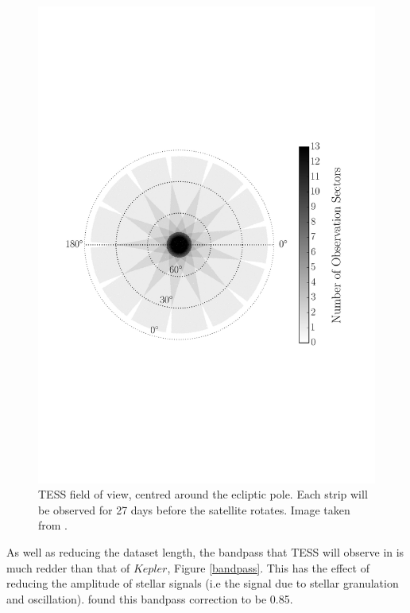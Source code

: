 \documentclass[a4paper,fleqn,usenatbib,useAMS]{mnras}
\newcommand{\kep}{\ensuremath{Kepler}}
\begin{document}
\begin{figure}
	\centering
	\includegraphics[scale=0.4]{cropped_TESSfield.pdf}
	\caption{TESS field of view, centred around the ecliptic pole. Each strip will be observed for 27 days before the satellite rotates. Image taken from \citet{campante_asteroseismic_2016}.}	
	\label{TESS field}
\end{figure} 

As well as reducing the dataset length, the bandpass that TESS will observe in is much redder than that of \kep, Figure \ref{bandpass}. This has the effect of reducing the amplitude of stellar signals (i.e the signal due to stellar granulation and oscillation). \citet{campante_asteroseismic_2016} found this bandpass correction to be 0.85.
\end{document}
